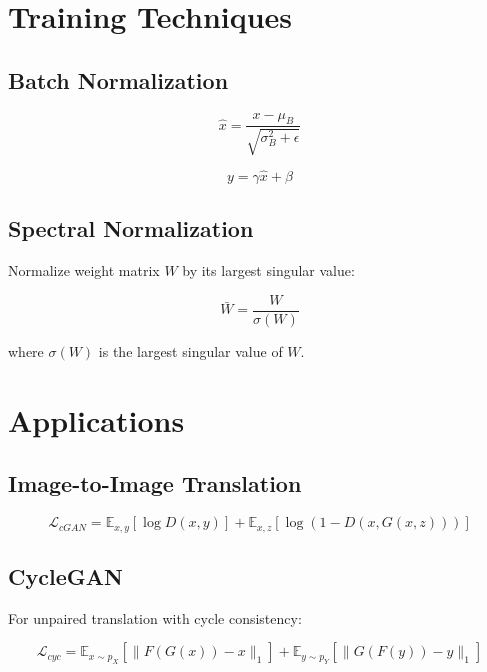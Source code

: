 \documentclass[12pt,a4paper]{article}
\begin{document}
\section{Training Techniques}

\subsection{Batch Normalization}

\begin{equation}
\hat{x} = \frac{x - \mu_B}{\sqrt{\sigma_B^2 + \epsilon}}
\end{equation}

\begin{equation}
y = \gamma \hat{x} + \beta
\end{equation}

\subsection{Spectral Normalization}

Normalize weight matrix $W$ by its largest singular value:

\begin{equation}
\bar{W} = \frac{W}{\sigma(W)}
\end{equation}

where $\sigma(W)$ is the largest singular value of $W$.

\section{Applications}

\subsection{Image-to-Image Translation}

\begin{equation}
\mathcal{L}_{cGAN} = \mathbb{E}_{x, y}[\log D(x, y)] + \mathbb{E}_{x, z}[\log(1 - D(x, G(x, z)))]
\end{equation}

\subsection{CycleGAN}

For unpaired translation with cycle consistency:

\begin{equation}
\mathcal{L}_{cyc} = \mathbb{E}_{x \sim p_X}[\|F(G(x)) - x\|_1] + \mathbb{E}_{y \sim p_Y}[\|G(F(y)) - y\|_1]
\end{equation}
\end{document}
